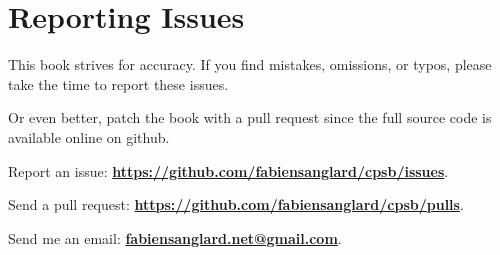 \chapter*{Reporting Issues}
This book strives for accuracy. If you find mistakes, omissions, or typos, please take the time to report these issues. 

Or even better, patch the book with a pull request since the full source code is available online on github.


Report an issue: \textbf{\href{https://github.com/fabiensanglard/cpsb/issues}{https://github.com/fabiensanglard/cpsb/issues}}.

Send a pull request: \textbf{\href{https://github.com/fabiensanglard/cpsb/pulls}{https://github.com/fabiensanglard/cpsb/pulls}}.

Send me an email: \textbf{\href{mailto:fabiensanglard.net@gmail.com}{fabiensanglard.net@gmail.com}}.
